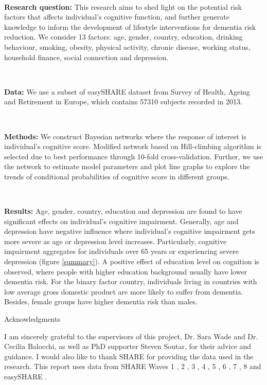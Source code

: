 \documentclass[11pt,twoside]{article}
\numberwithin{Theorem}{section}
\numberwithin{Definition}{section}
\numberwithin{Lemma}{section}
\numberwithin{Algorithm}{section}
\numberwithin{equation}{section}
\begin{document}
\

\textbf{Research question:} This research aims to shed light on the potential risk factors that affects individual's cognitive function, and further generate knowledge to inform the development of lifestyle interventions for dementia risk reduction. We consider 13 factors: age, gender, country, education, drinking behaviour, smoking, obesity, physical activity, chronic disease, working status, household finance, social connection and depression.

\

\textbf{Data:} We use a subset of easySHARE dataset from Survey of Health, Ageing and Retirement in Europe, which contains 57310 subjects recorded in 2013.

\

\textbf{Methods:} We construct Bayesian networks where the response of interest is individual's cognitive score. Modified network based on Hill-climbing algorithm is selected due to best performance through 10-fold cross-validation. Further, we use the network to estimate model parameters and plot line graphs to explore the trends of conditional probabilities of cognitive score in different groups.

\

\textbf{Results:} Age, gender, country, education and depression are found to have significant effects on individual's cognitive impairment. Generally, age and depression have negative influence where individual's cognitive impairment gets more severe as age or depression level increases. Particularly, cognitive impairment aggregates for individuals over 65 years or experiencing severe depression (figure \ref{summary}). A positive effect of education level on cognition is observed, where people with higher education background usually have lower dementia risk. For the binary factor country, individuals living in countries with low average gross domestic product are more likely to suffer from dementia. Besides, female groups have higher dementia risk than males.

\clearpage

\begin{center}
\Large{Acknowledgments}
\end{center}

I am sincerely grateful to the supervisors of this project, Dr. Sara Wade and Dr. Cecilia Balocchi, as well as PhD supporter Steven Soutar, for their advice and guidance. I would also like to thank SHARE for providing the data used in the research. This report uses data from SHARE Waves 1 \cite{share1}, 2 \cite{share2}, 3 \cite{share3}, 4 \cite{share4}, 5 \cite{share5}, 6 \cite{share6}, 7 \cite{share7}, 8 \cite{share8} and easySHARE \cite{easyshare}.
\end{document}
